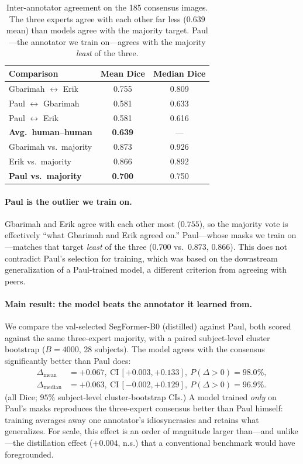 \documentclass[letterpaper,twocolumn,10pt]{article}
\begin{document}
\begin{table}[t]
\centering
\small
\caption{Inter-annotator agreement on the 185 consensus images. The three experts
agree with each other far less ($0.639$ mean) than models agree with the majority
target. Paul---the annotator we train on---agrees with the majority \emph{least} of
the three.}
\label{tab:inter}
\begin{tabular}{lcc}
\toprule
Comparison & Mean Dice & Median Dice \\
\midrule
Gbarimah $\leftrightarrow$ Erik      & 0.755 & 0.809 \\
Paul $\leftrightarrow$ Gbarimah      & 0.581 & 0.633 \\
Paul $\leftrightarrow$ Erik          & 0.581 & 0.616 \\
\textbf{Avg.\ human--human}          & \textbf{0.639} & --- \\
\midrule
Gbarimah vs.\ majority               & 0.873 & 0.926 \\
Erik vs.\ majority                   & 0.866 & 0.892 \\
\textbf{Paul vs.\ majority}          & \textbf{0.700} & 0.750 \\
\bottomrule
\end{tabular}
\end{table}

\paragraph{Paul is the outlier we train on.}
Gbarimah and Erik agree with each other most ($0.755$), so the majority vote is
effectively ``what Gbarimah and Erik agreed on.'' Paul---whose masks we train
on---matches that target \emph{least} of the three ($0.700$ vs.\ $0.873$, $0.866$).
This does not contradict Paul's selection for training, which was based on the
downstream generalization of a Paul-trained model, a different criterion from
agreeing with peers.

\paragraph{Main result: the model beats the annotator it learned from.}
We compare the val-selected SegFormer-B0 (distilled) against Paul, both scored
against the same three-expert majority, with a paired subject-level cluster
bootstrap ($B{=}4000$, 28 subjects). The model agrees with the consensus
significantly better than Paul does:
{\small
\[
\begin{aligned}
\Delta_{\text{mean}} &= +0.067,\ \text{CI}\,[+0.003,+0.133],\ P(\Delta{>}0){=}98.0\%,\\
\Delta_{\text{median}} &= +0.063,\ \text{CI}\,[-0.002,+0.129],\ P(\Delta{>}0){=}96.9\%.
\end{aligned}
\]}%
(all Dice; $95\%$ subject-level cluster-bootstrap CIs.)
A model trained \emph{only} on Paul's masks reproduces the three-expert consensus
better than Paul himself: training averages away one annotator's idiosyncrasies
and retains what generalizes. For scale, this effect is an order of magnitude
larger than---and unlike---the distillation effect ($+0.004$, n.s.) that a
conventional benchmark would have foregrounded.
\end{document}
